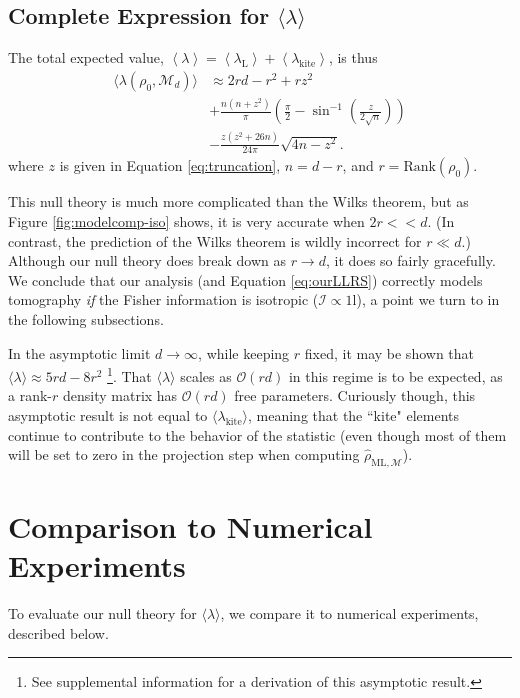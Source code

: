 \documentclass[aps,pra, twocolumn]{revtex4-1}
\newcommand{\M}{\mathcal{M}}
\newcommand{\Id}{\mathbb{I}}
\newcommand{\expect}[1]{\ensuremath{\left\langle#1\right\rangle}}
\def\Id{1\!\mathrm{l}}
\newcommand{\Fi}{\mathcal{I}}
\newcommand{\rhohat}{\hat{\rho}}
\newcommand{\rhoML}[1]{\rhohat_{\scriptscriptstyle{\mathrm{ML},#1}}}
\begin{document}
\subsection{Complete Expression for $\langle \lambda \rangle$}
\label{subsec:LLRS}
The total expected value, $\expect{\lambda} = \expect{\lambda_{\mathrm{L}}} + \expect{\lambda_{\mathrm{kite}}}$, is thus
\begin{align}
\label{eq:ourLLRS}
\nonumber \langle \lambda(\rho_{0}, \M_{d}) \rangle &\approx 2rd - r^{2}+rz^{2}\\
\nonumber & + \frac{n(n+z^{2})}{\pi}\left(\frac{\pi}{2} - \sin^{-1}\left(\frac{z}{2\sqrt{n}}\right)\right) \\
& - \frac{z(z^{2}+26n)}{24\pi}\sqrt{4n-z^{2}}.
\end{align}
where $z$ is given in Equation \eqref{eq:truncation}, $n=d-r$, and $r = \mathrm{Rank}(\rho_{0})$.

This null theory is much more complicated than the Wilks theorem, but as Figure \ref{fig:modelcomp-iso} shows, it is very accurate when $2r << d$. (In contrast, the prediction of the Wilks theorem is wildly incorrect for $r\ll d$.) Although our null theory does break down as $r \rightarrow d$, it does so fairly gracefully. We conclude that our analysis (and Equation \eqref{eq:ourLLRS}) correctly models tomography \emph{if} the Fisher information is isotropic ($\Fi \propto \Id$), a point we turn to in the following subsections.

In the asymptotic limit $d\rightarrow \infty$, while keeping $r$ fixed, it may be shown that $\langle \lambda \rangle \approx 5rd - 8r^{2}$  \footnote{See supplemental information for a derivation of this asymptotic result.}. That $\langle \lambda \rangle$ scales as $\mathcal{O}(rd)$ in this regime is to be expected, as a rank-$r$ density matrix has $\mathcal{O}(rd)$ free parameters. Curiously though, this asymptotic result is not equal to $\langle \lambda_{\mathrm{kite}}\rangle$, meaning that the ``kite" elements continue to contribute to the behavior of the statistic (even though most of them will be set to zero in the projection step when computing $\rhoML{\M}$).

\section{Comparison to Numerical Experiments}

To evaluate our null theory for $\langle \lambda \rangle$, we compare it to numerical experiments, described below.
\end{document}
